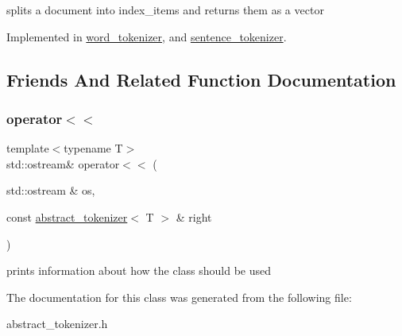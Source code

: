 splits a document into index\+\_\+items and returns them as a vector 

Implemented in \hyperlink{classword__tokenizer_ac51f61652880447073e16fdb0f471fbe}{word\+\_\+tokenizer}, and \hyperlink{classsentence__tokenizer_abd8fdaae180f7c8c6dea91c68f7b8865}{sentence\+\_\+tokenizer}.



\subsection{Friends And Related Function Documentation}
\mbox{\label{classabstract__tokenizer_abca989b4c879ea066af32a6aa0c84376}} 
\subsubsection{\texorpdfstring{operator$<$$<$}{operator<<}}
{\footnotesize\ttfamily template$<$typename T$>$ \\
std\+::ostream\& operator$<$$<$ (\begin{DoxyParamCaption}\item[{std\+::ostream \&}]{os,  }\item[{const \hyperlink{classabstract__tokenizer}{abstract\+\_\+tokenizer}$<$ T $>$ \&}]{right }\end{DoxyParamCaption})\hspace{0.3cm}{\ttfamily [friend]}}

prints information about how the class should be used 

The documentation for this class was generated from the following file\+:\begin{DoxyCompactItemize}
\item 
abstract\+\_\+tokenizer.\+h\end{DoxyCompactItemize}
